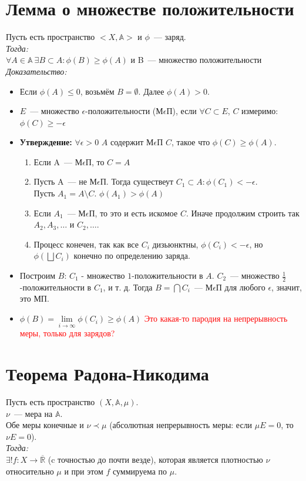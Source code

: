 \documentclass[paper=a4, fontsize=17pt]{article}
\begin{document}
\section{Лемма о множестве положительности}
	Пусть есть пространство $<X, \mathbb{A}>$ и $\phi$~--- заряд.\\
	\emph{Тогда:}\\
		$\forall A\in \mathbb{A}\ \exists B \subset A : \phi(B) \geq \phi(A)$ и B~--- множество положительности \\
	\emph{Доказательство: }
		\begin{itemize}
			\item Если $\phi(A) \leq 0$, возьмём $B = \emptyset$. Далее $\phi(A) > 0$.
			\item $E$~--- множество $\epsilon$-положительности (М$\epsilon$П), если  $\forall C \subset E$, $C$ измеримо: $\phi(C) \geq -\epsilon$
			\item \textbf{Утверждение:} $\forall \epsilon>0$ $A$ содержит М$\epsilon$П $C$, такое что $\phi(C) \geq \phi(A)$.
			\begin{enumerate}
				\item Если A~--- М$\epsilon$П, то $C = A$
				\item Пусть A~--- не М$\epsilon$П. Тогда существеут $C_1 \subset A : \phi(C_1) < -\epsilon$.\\
                Пусть $A_1 = A \setminus C$. $\phi(A_1) > \phi(A)$\\
                \item Если $A_1$~--- М$\epsilon$П, то это и есть искомое $C$. Иначе продолжим строить так $A_2,A_3,\dots$ и $C_2,\dots$.
				\item Процесс конечен, так как все $C_i$ дизьюнктны, $\phi(C_i) < -\epsilon$, но $\phi(\bigsqcup C_i)$ конечно по определению заряда.
			\end{enumerate}
			\item Построим $B$: $C_1$ - множество $1$-положительности в $A$. $C_2$~--- множество $\frac{1}{2}$-положительности в $C_1$, и т. д.
                Тогда $B = \bigcap C_i$~--- М$\epsilon$П для любого $\epsilon$, значит, это МП.
			\item $\phi(B) = \lim\limits_{i \rightarrow \infty} \phi(C_i) \geq \phi(A)$
                \textcolor{red}{Это какая-то пародия на непрерывность меры, только для зарядов?}
		\end{itemize}
\section{Теорема Радона-Никодима}
	Пусть есть пространство $(X, \mathbb{A}, \mu)$. \\
	$\nu$~--- мера на $\mathbb{A}$. \\
	Обе меры конечные и $\nu \prec \mu$ (абсолютная непрерывность меры: если $\mu E = 0$, то $\nu E = 0$). \\
	\emph{Тогда: } \\
		$\exists! f: X \rightarrow \overline{\mathds{R}}$ (c точностью до почти везде), которая является плотностью $\nu$ относительно $\mu$ и при этом $f$ суммируема по $\mu$.
\end{document}
